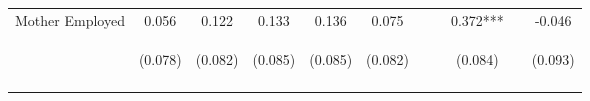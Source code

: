 \begin{tabular}{lcccccccccc}
\noalign{\smallskip}Mother Employed & 0.056 & 0.122 & 0.133 & 0.136 & 0.075 &  &  & 0.372*** &  & -0.046\\
 & \begin{footnotesize}(0.078)\end{footnotesize} & \begin{footnotesize}(0.082)\end{footnotesize} & \begin{footnotesize}(0.085)\end{footnotesize} & \begin{footnotesize}(0.085)\end{footnotesize} & \begin{footnotesize}(0.082)\end{footnotesize} & \begin{footnotesize}\end{footnotesize} & \begin{footnotesize}\end{footnotesize} & \begin{footnotesize}(0.084)\end{footnotesize} & \begin{footnotesize}\end{footnotesize} & \begin{footnotesize}(0.093)\end{footnotesize}\\
\noalign{\smallskip}\hline\end{tabular}\\
